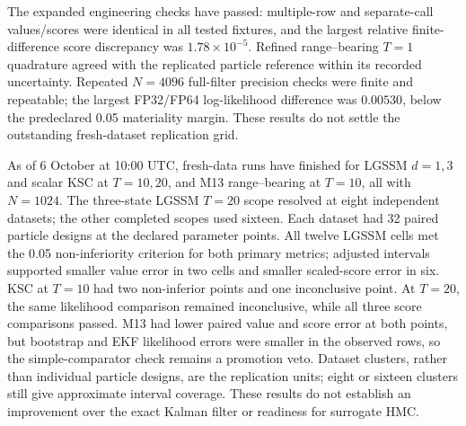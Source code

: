 \documentclass[11pt]{article}
\begin{document}
The expanded engineering checks have passed: multiple-row and separate-call
values/scores were identical in all tested fixtures, and the largest relative
finite-difference score discrepancy was $1.78\times10^{-5}$. Refined
range--bearing $T=1$ quadrature agreed with the replicated particle reference
within its recorded uncertainty. Repeated $N=4096$ full-filter precision checks
were finite and repeatable; the largest FP32/FP64 log-likelihood difference
was $0.00530$, below the predeclared 0.05 materiality margin. These results
do not settle the outstanding fresh-dataset replication grid.

As of 6 October at 10:00 UTC, fresh-data runs have finished for LGSSM
$d=1,3$ and scalar KSC at $T=10,20$, and M13 range--bearing at $T=10$,
all with $N=1024$. The three-state LGSSM $T=20$ scope resolved at eight
independent datasets; the other completed scopes used sixteen. Each dataset
had 32 paired particle designs at the declared parameter points. All twelve
LGSSM cells met the 0.05 non-inferiority criterion for both primary metrics;
adjusted intervals supported smaller value error in two cells and smaller
scaled-score error in six. KSC at $T=10$ had two non-inferior points and
one inconclusive point. At $T=20$, the same likelihood comparison remained
inconclusive, while all three score comparisons passed. M13 had lower paired
value and score error at both points, but bootstrap and EKF likelihood errors
were smaller in the observed rows, so the simple-comparator check remains a
promotion veto. Dataset clusters, rather than individual particle designs,
are the replication units; eight or sixteen clusters still give approximate
interval coverage. These results do not establish an improvement over the
exact Kalman filter or readiness for surrogate HMC.
\end{document}
